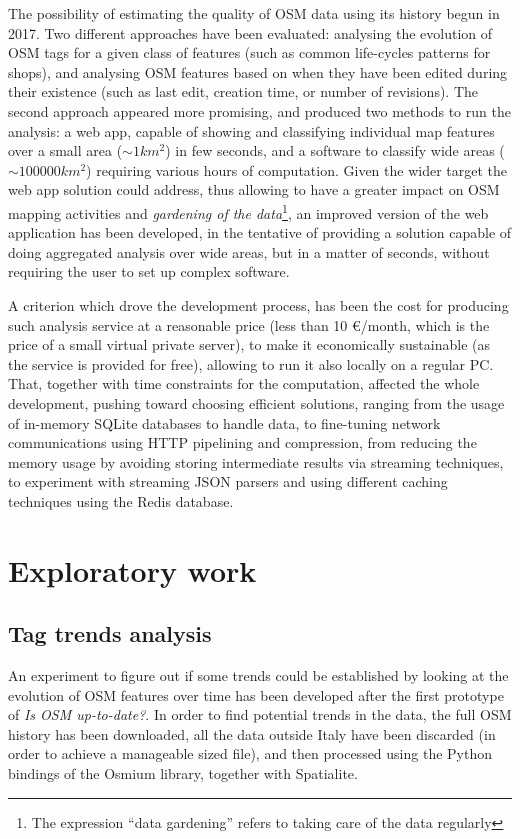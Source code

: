 \documentclass{Configuration_Files/PoliMi3i_thesis}
\begin{document}
The possibility of estimating the quality of OSM data using its history begun in 2017. Two different approaches have been evaluated: analysing the evolution of OSM tags for a given class of features (such as common life-cycles patterns for shops), and analysing OSM features based on when they have been edited during their existence (such as last edit, creation time, or number of revisions). The second approach appeared more promising, and produced two methods to run the analysis: a web app, capable of showing and classifying individual map features over a small area ($\sim\num{1} \unit{km^2}$) in few seconds, and a software to classify wide areas ($\sim \num{100000} \unit{km^2}$) requiring various hours of computation. Given the wider target the web app solution could address, thus allowing to have a greater impact on OSM mapping activities and \textit{gardening of the data}\footnote{The expression “data gardening” refers to taking care of the data regularly}, an improved version of the web application has been developed, in the tentative of providing a solution capable of doing aggregated analysis over wide areas, but in a matter of seconds, without requiring the user to set up complex software.

A criterion which drove the development process, has been the cost for producing such analysis service at a reasonable price (less than 10 €/month, which is the price of a small virtual private server), to make it economically sustainable (as the service is provided for free), allowing to run it also locally on a regular PC. That, together with time constraints for the computation, affected the whole development, pushing toward choosing efficient solutions, ranging from the usage of in-memory SQLite databases to handle data, to fine-tuning network communications using HTTP pipelining and compression, from reducing the memory usage by avoiding storing intermediate results via streaming techniques, to experiment with streaming JSON parsers and using different caching techniques using the Redis database.

\section{Exploratory work}

\subsection{Tag trends analysis}

An experiment to figure out if some trends could be established by looking at the evolution of OSM features over time has been developed after the first prototype of \textit{Is OSM up-to-date?}.
In order to find potential trends in the data, the full OSM history has been downloaded, all the data outside Italy have been discarded (in order to achieve a manageable sized file), and then processed using the Python bindings of the Osmium library, together with Spatialite.
\end{document}
